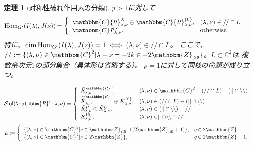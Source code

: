 \documentclass[12pt]{msjproc} %
\newcommand{\assign}{:=}
\newcommand{\tmop}[1]{\ensuremath{\operatorname{#1}}}
\newtheorem{theorem}{定理}
\newcommand{\Hom}{\mbox{\normalfont Hom}}
\newcommand{\OpR}{\mbox{\it R}}
\begin{document}
\begin{theorem}[対称性破れ作用素の分類]
  $p > 1$に対して
  \begin{eqnarray}
	  & \Hom_{G'}(I(\lambda),J(\nu))= \left\{
    \begin{array}{ll}
      \mathbbm{C} {\OpR}_{\lambda, \nu}^{X} \oplus \mathbbm{C}
      {\OpR}^{\{ 0 \}}_{\lambda, \nu}, & (\lambda, \nu) \in / /\cap 
      L\\
      \mathbbm{C} \OpR^X_{\lambda, \nu}, &
      \mbox{\normalfont otherwise.}
    \end{array} \right. &  \nonumber
  \end{eqnarray}
  特に、$\dim\Hom_{G'}(I(\lambda),J(\nu))=1\iff(\lambda,\nu)\in//\cap L$。
  ここで、$//\assign \{ (\lambda, \nu) \in \mathbbm{C}^2 |
  \lambda - \nu = - 2 k \in - 2\mathbbm{Z}_{\geqslant 0} \}$。$L\subset\mathbb{C}^2$は
  複数余次元$1$の部分集合（具体形は省略する）。
  $p=1$に対して同様の命題が成り立つ。
\begin{versiona}
\[ \mathcal{S} \tmop{ol} (\mathbbm{R}^n ; \lambda, \nu) = \left\{
   \begin{array}{ll}
     \tilde{K}_{\lambda, \nu}^{\mathbbm{R}^n}, & (\lambda, \nu) \in
     \mathbbm{C}^2 - (/ / \cap L) - (| | \cap \backslash\backslash)\\
     \widetilde{\tilde{K}}_{\lambda, \nu}^{\mathbbm{R}^n} \oplus \tilde{K}^{\{
     0 \}}_{\lambda, \nu}, & (\lambda, \nu) \in (/ / \cap L) - (| | \cap
     \backslash\backslash)\\
     \tilde{K}_{\lambda, \nu}^P \oplus \tilde{K}_{\lambda, \nu}^C, & (\lambda,
     \nu) \in (| | \cap \backslash\backslash) - / /\\
     \tilde{K}^{\{ 0 \}}_{\lambda, \nu}, & (\lambda, \nu) \in \mid
     \mid \cap \backslash\backslash \cap / /
   \end{array} \right. \]
\[ L \assign \left\{ \begin{array}{ll}
     \{ (\lambda, \nu) \in \mathbbm{C}^2 | \nu \in \mathbbm{Z}_{\leqslant 0}
     \cup (2\mathbbm{Z}_{\geqslant 0} + 1) \}, & q \in 2\mathbbm{Z}\\
     \{ (\lambda, \nu) \in \mathbbm{C}^2 | \nu \in 2\mathbbm{Z} \}, & q \in
     2\mathbbm{Z}+ 1.
   \end{array} \right. \]
\end{versiona}
\end{theorem}
\end{document}
